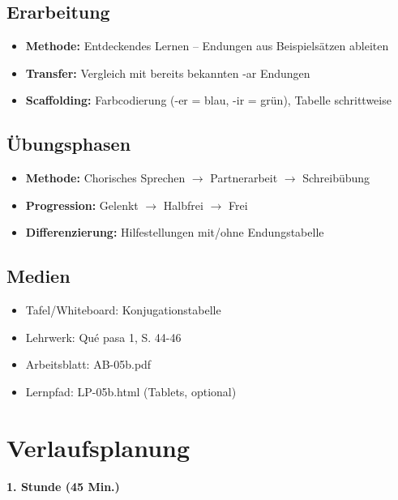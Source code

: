 \documentclass[11pt,a4paper]{article}
\newcommand{\lehrwerk}{Qué pasa 1}
\newcommand{\lehrwerkseite}{S. 44-46}
\begin{document}
\subsection{Erarbeitung}
\begin{itemize}
    \item \textbf{Methode:} Entdeckendes Lernen -- Endungen aus Beispielsätzen ableiten
    \item \textbf{Transfer:} Vergleich mit bereits bekannten -ar Endungen
    \item \textbf{Scaffolding:} Farbcodierung (-er = blau, -ir = grün), Tabelle schrittweise
\end{itemize}

\subsection{Übungsphasen}
\begin{itemize}
    \item \textbf{Methode:} Chorisches Sprechen $\rightarrow$ Partnerarbeit $\rightarrow$ Schreibübung
    \item \textbf{Progression:} Gelenkt $\rightarrow$ Halbfrei $\rightarrow$ Frei
    \item \textbf{Differenzierung:} Hilfestellungen mit/ohne Endungstabelle
\end{itemize}

\subsection{Medien}
\begin{itemize}
    \item Tafel/Whiteboard: Konjugationstabelle
    \item Lehrwerk: \lehrwerk, \lehrwerkseite
    \item Arbeitsblatt: AB-05b.pdf
    \item Lernpfad: LP-05b.html (Tablets, optional)
\end{itemize}

\section{Verlaufsplanung}

\textbf{1. Stunde (45 Min.)}
\end{document}
